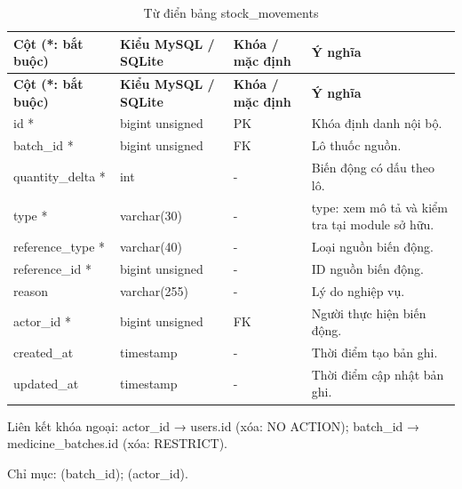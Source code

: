 {\fontsize{10}{12}\selectfont\setlength{\tabcolsep}{3pt}\renewcommand{\arraystretch}{1.12}
\begin{longtable}{@{}L{\textwidth-4.86pt\relax} L{\textwidth-3.96pt\relax} L{\textwidth-2.88pt\relax} L{\textwidth-6.3pt\relax}@{}}
\caption{Từ điển bảng stock\_\allowbreak{}movements}\\
\toprule
\textbf{Cột (*:\allowbreak{} bắt buộc)} & \textbf{Kiểu My\allowbreak{}SQL /\allowbreak{} SQLite} & \textbf{Khóa /\allowbreak{} mặc định} & \textbf{Ý nghĩa}\\\midrule
\endfirsthead
\toprule
\textbf{Cột (*:\allowbreak{} bắt buộc)} & \textbf{Kiểu My\allowbreak{}SQL /\allowbreak{} SQLite} & \textbf{Khóa /\allowbreak{} mặc định} & \textbf{Ý nghĩa}\\\midrule
\endhead
\bottomrule\endlastfoot
id * & bigint unsigned & PK & Khóa định danh nội bộ.\allowbreak{}\\[1pt]
batch\_\allowbreak{}id * & bigint unsigned & FK & Lô thuốc nguồn.\allowbreak{}\\[1pt]
quantity\_\allowbreak{}delta * & int & - & Biến động có dấu theo lô.\allowbreak{}\\[1pt]
type * & varchar(30) & - & type:\allowbreak{} xem mô tả và kiểm tra tại module sở hữu.\allowbreak{}\\[1pt]
reference\_\allowbreak{}type * & varchar(40) & - & Loại nguồn biến động.\allowbreak{}\\[1pt]
reference\_\allowbreak{}id * & bigint unsigned & - & ID nguồn biến động.\allowbreak{}\\[1pt]
reason & varchar(255) & - & Lý do nghiệp vụ.\allowbreak{}\\[1pt]
actor\_\allowbreak{}id * & bigint unsigned & FK & Người thực hiện biến động.\allowbreak{}\\[1pt]
created\_\allowbreak{}at & timestamp & - & Thời điểm tạo bản ghi.\allowbreak{}\\[1pt]
updated\_\allowbreak{}at & timestamp & - & Thời điểm cập nhật bản ghi.\allowbreak{}\\[1pt]
\end{longtable}}
Liên kết khóa ngoại:\allowbreak{} actor\_\allowbreak{}id → users.\allowbreak{}id (xóa:\allowbreak{} NO ACTION); batch\_\allowbreak{}id → medicine\_\allowbreak{}batches.\allowbreak{}id (xóa:\allowbreak{} RESTRICT).\allowbreak{}

Chỉ mục:\allowbreak{} (batch\_\allowbreak{}id); (actor\_\allowbreak{}id).\allowbreak{}

